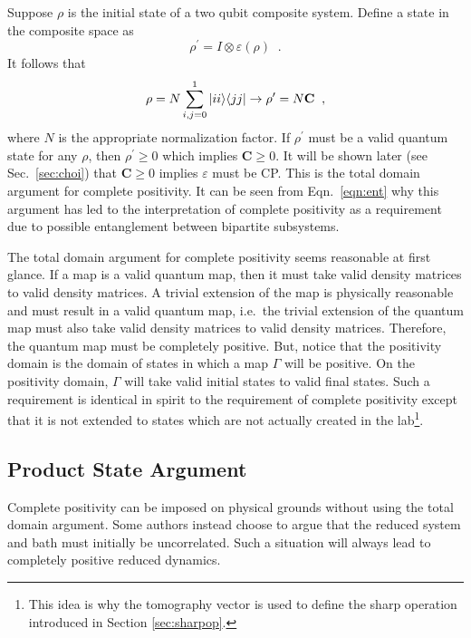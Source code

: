 Suppose $\rho$ is the initial state of a two qubit composite system.  Define a state in the composite space as
 \begin{equation}
\rho^\prime = I\otimes\varepsilon\left(\rho\right)\;\;.
\end{equation}
It follows that
\begin{equation}
\label{eqn:ent}
\rho = N\sum_{i,j=0}^1|ii\rangle\langle jj| \rightarrow \rho^\prime = N\mathbf{C}\;\;,
\end{equation}
 where $N$ is the appropriate normalization factor.  If $\rho^\prime$ must be a valid quantum state for any $\rho$, then $\rho^\prime\ge 0$ which implies $\mathbf{C}\ge 0$.  It will be shown later (see Sec.\ \ref{sec:choi}) that $\mathbf{C}\ge 0$ implies $\varepsilon$ must be CP.  This is the total domain argument for complete positivity.  It can be seen from Eqn.\ \ref{eqn:ent} why this argument has led to the interpretation of complete positivity as a requirement due to possible entanglement between bipartite subsystems.

The total domain argument for complete positivity seems reasonable at first glance.  If a map is a valid quantum map, then it must take valid density matrices to valid density matrices.  A trivial extension of the map is physically reasonable and must result in a valid quantum map, i.e.\ the trivial extension of the quantum map must also take valid density matrices to valid density matrices.  Therefore, the quantum map must be completely positive.  But, notice that the positivity domain is the domain of states in which a map $\Gamma$ will be positive.  On the positivity domain, $\Gamma$ will take valid initial states to valid final states.  Such a requirement is identical in spirit to the requirement of complete positivity except that it is not extended to states which are not actually created in the lab\footnote{This idea is why the tomography vector is used to define the sharp operation introduced in Section \ref{sec:sharpop}.}. 

\subsection{Product State Argument}

Complete positivity can be imposed on physical grounds without using the total domain argument.  Some authors instead choose to argue that the reduced system and bath must initially be uncorrelated.  Such a situation will always lead to completely positive reduced dynamics. 

